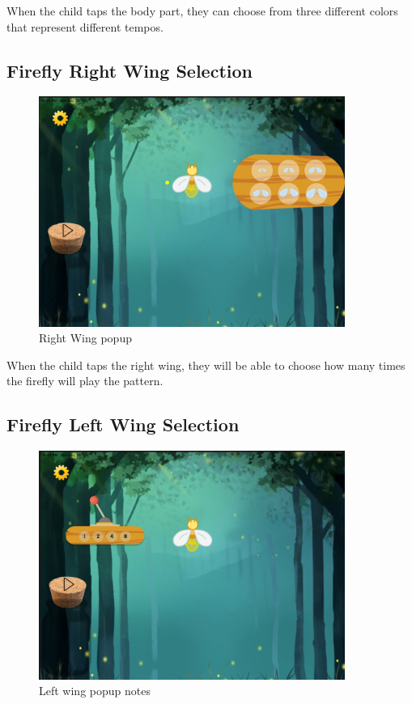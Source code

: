 When the child taps the body part, they can choose from three different colors that represent different tempos.

\subsection{Firefly Right Wing Selection}

\begin{figure}[H]
    \centering
    \includegraphics[width=10cm]{figures/newScreenFlows/newrightwing.png}
    \caption{Right Wing popup}
    \label{fig:newrightwing}
\end{figure}

When the child taps the right wing, they will be able to choose how many times the firefly will play the pattern.

\subsection{Firefly Left Wing Selection}

\begin{figure}[H]
    \centering
    \includegraphics[width=10cm]{figures/newScreenFlows/newleftwing2.png}
    \caption{Left wing popup notes}
    \label{fig:newleftwing}
\end{figure}

